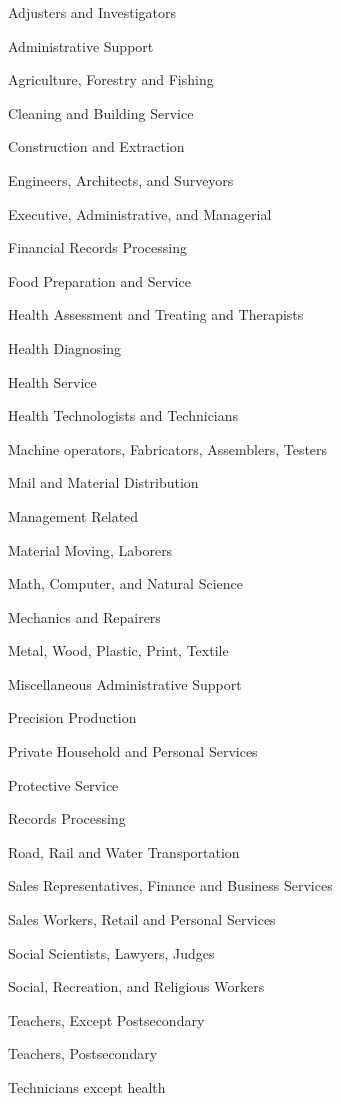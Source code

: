 \documentclass[11pt]{article}
\begin{document}
   
   Adjusters and Investigators
   
   Administrative Support
   
   Agriculture, Forestry and Fishing
   
   Cleaning and Building Service 
   
   Construction and Extraction
   
   Engineers, Architects, and Surveyors
   
   Executive, Administrative, and Managerial
   
   Financial Records Processing 
   
   Food Preparation and Service 
   
   Health Assessment and Treating and Therapists
   
   Health Diagnosing
   
   Health Service
   
   Health Technologists and Technicians
   
   Machine operators, Fabricators, Assemblers, Testers
   
   Mail and Material Distribution
   
   Management Related
   
   Material Moving, Laborers
   
   Math, Computer, and Natural Science
   
   Mechanics and Repairers
   
   Metal, Wood, Plastic, Print, Textile
   
   Miscellaneous Administrative Support
   
   Precision Production
   
   Private Household and Personal Services
   
   Protective Service
   
   Records Processing
   
   Road, Rail and Water Transportation
   
   Sales Representatives, Finance and Business Services
   
   Sales Workers, Retail and Personal Services
   
   Social Scientists, Lawyers, Judges
   
   Social, Recreation, and Religious Workers
   
   Teachers, Except Postsecondary
   
   Teachers, Postsecondary
   
   Technicians except health
   
\end{document}
